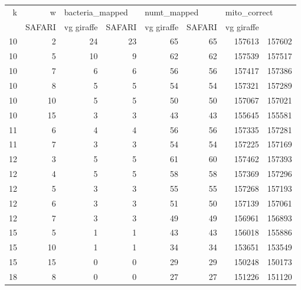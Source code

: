 \begin{tabular}{rrrrrrrr}
\toprule
 k &  w & \multicolumn{2}{l}{bacteria\_mapped} & \multicolumn{2}{l}{numt\_mapped} & \multicolumn{2}{l}{mito\_correct} \\
   &          SAFARI & vg giraffe &      SAFARI & vg giraffe &       SAFARI & vg giraffe \\
\midrule
10 &  2 &              24 &         23 &          65 &         65 &       157613 &     157602 \\
10 &  5 &              10 &          9 &          62 &         62 &       157539 &     157517 \\
10 &  7 &               6 &          6 &          56 &         56 &       157417 &     157386 \\
10 &  8 &               5 &          5 &          54 &         54 &       157321 &     157289 \\
10 & 10 &               5 &          5 &          50 &         50 &       157067 &     157021 \\
10 & 15 &               3 &          3 &          43 &         43 &       155645 &     155581 \\
11 &  6 &               4 &          4 &          56 &         56 &       157335 &     157281 \\
11 &  7 &               3 &          3 &          54 &         54 &       157225 &     157169 \\
12 &  3 &               5 &          5 &          61 &         60 &       157462 &     157393 \\
12 &  4 &               5 &          5 &          58 &         58 &       157369 &     157296 \\
12 &  5 &               3 &          3 &          55 &         55 &       157268 &     157193 \\
12 &  6 &               3 &          3 &          51 &         50 &       157139 &     157061 \\
12 &  7 &               3 &          3 &          49 &         49 &       156961 &     156893 \\
15 &  5 &               1 &          1 &          43 &         43 &       156018 &     155886 \\
15 & 10 &               1 &          1 &          34 &         34 &       153651 &     153549 \\
15 & 15 &               0 &          0 &          29 &         29 &       150248 &     150173 \\
18 &  8 &               0 &          0 &          27 &         27 &       151226 &     151120 \\

\end{tabular}
